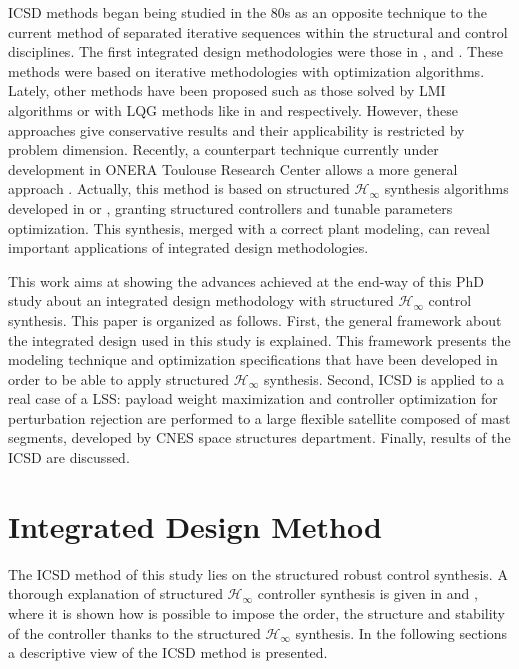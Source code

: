 \documentclass{ifacconf}
\begin{document}
ICSD methods began being studied in the 80s as an opposite technique to the current method of separated iterative sequences within the structural and control disciplines. The first integrated design methodologies were those in \cite{Haftka1987_ID}, \cite{Gilbert1988_ID} and \cite{Messac1992_ID}. These methods were based on iterative methodologies with optimization algorithms. Lately, other methods have been proposed such as those solved by LMI algorithms or with LQG methods like in \cite{Hiramoto2009_ID} and \cite{Cimellaro2008_ID} respectively. However, these approaches give conservative results and their applicability is restricted by problem dimension. Recently, a counterpart technique currently under development in ONERA Toulouse Research Center allows a more general approach \citep{Alazard2013_ID}.  Actually, this method is based on structured $\mathcal{H}_\infty$ synthesis algorithms developed in \cite{Gahinet2011_Hinf} or \cite{Burke2006_Hinf}, granting structured controllers and tunable parameters optimization. This synthesis, merged with a correct plant modeling, can reveal important applications of integrated design methodologies.

This work aims at showing the advances achieved at the end-way of this PhD study about an integrated design methodology with structured $\mathcal{H}_{\infty}$ control synthesis. This paper is organized as follows. First, the general framework about the integrated design used in this study is explained. This framework presents the modeling technique and optimization specifications that have been developed in order to be able to apply structured $\mathcal{H}_\infty$ synthesis. Second, ICSD is applied to a real case of a LSS: payload weight maximization and controller optimization for perturbation rejection are performed to a large flexible satellite composed of mast segments, developed by CNES space structures department. Finally, results of the ICSD are discussed.

\section{Integrated Design Method}
\label{sec:Method}

The ICSD method of this study lies on the structured robust control synthesis. A thorough explanation of structured $\mathcal{H}_\infty$ controller synthesis is given in \cite{Gahinet2011_Hinf} and \cite{Burke2006_Hinf}, where it is shown how is possible to impose the order, the structure and stability of the controller thanks to the structured $\mathcal{H}_\infty$ synthesis. In the following sections a descriptive view of the ICSD method is presented.
\end{document}
